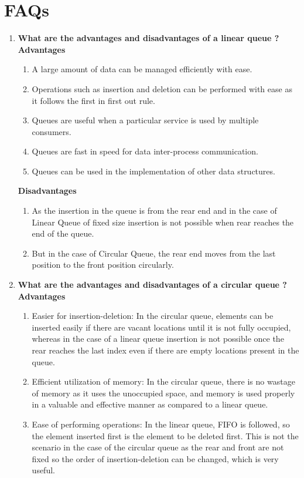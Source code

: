 \documentclass[11pt]{article}
\begin{document}
\section{FAQs}
\begin{enumerate}
	\item \textbf{What are the advantages and disadvantages of a linear queue ?}\\
	      \textbf{Advantages}
	      \begin{enumerate}
		      \item A large amount of data can be managed efficiently with ease.
		      \item Operations such as insertion and deletion can be performed with ease as it follows the first in first out rule.
		      \item Queues are useful when a particular service is used by multiple consumers.
		      \item Queues are fast in speed for data inter-process communication.
		      \item Queues can be used in the implementation of other data structures.
	      \end{enumerate}
	      \textbf{Disadvantages}
	      \begin{enumerate}
		      \item As the insertion in the queue is from the rear end and in the case of Linear Queue of fixed size insertion is not possible when rear reaches the end of the queue.
		      \item But in the case of Circular Queue, the rear end moves from the last position to the front position circularly.
	      \end{enumerate}
	\item \textbf{What are the advantages and disadvantages of a circular queue ?}\\
	      \textbf{Advantages}
	      \begin{enumerate}
		      \item Easier for insertion-deletion: In the circular queue, elements can be inserted easily if there are vacant locations until it is not fully occupied, whereas in the case of a linear queue insertion is not possible once the rear reaches the last index even if there are empty locations present in the queue.
		      \item Efficient utilization of memory: In the circular queue, there is no wastage of memory as it uses the unoccupied space, and memory is used properly in a valuable and effective manner as compared to a linear queue.
		      \item Ease of performing operations: In the linear queue, FIFO is followed, so the element inserted first is the element to be deleted first. This is not the scenario in the case of the circular queue as the rear and front are not fixed so the order of insertion-deletion can be changed, which is very useful.
	      \end{enumerate}


\end{enumerate}
\end{document}
